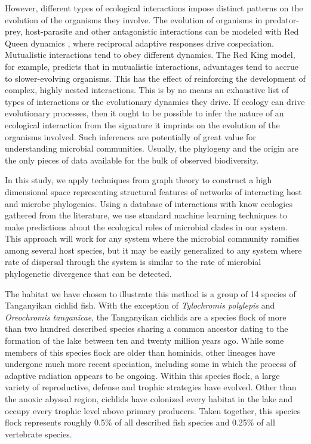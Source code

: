 However, different types of ecological interactions impose distinct patterns on the evolution of the organisms they involve. The evolution of organisms in predator-prey, host-parasite and other antagonistic interactions can be modeled with Red Queen dynamics \cite{van1973new}, where reciprocal adaptive responses drive cospeciation. Mutualistic interactions tend to obey different dynamics. The Red King model, \cite{bergstrom2003red, gokhale2012mutualism} for example, predicts that in mutualistic interactions, advantages tend to accrue to slower-evolving organisms. This has the effect of reinforcing the development of complex, highly nested interactions. \cite{bastolla2009architecture, rezende2007non } This is by no means an exhaustive list of types of interactions or the evolutionary dynamics they drive. If ecology can drive evolutionary processes, then it ought to be possible to infer the nature of an ecological interaction from the signature it imprints on the evolution of the organisms involved. Such inferences are potentially of great value for understanding microbial communities. Usually, the phylogeny and the origin are the only pieces of data available for the bulk of observed biodiversity.

In this study, we apply techniques from graph theory to construct a high dimensional space representing structural features of networks of interacting host and microbe phylogenies. Using a database of interactions with know ecologies gathered from the literature, we use standard machine learning techniques to make predictions about the ecological roles of microbial clades in our system. This approach will work for any system where the microbial community ramifies among several host species, but it may be easily generalized to any system where rate of dispersal through the system is similar to the rate of microbial phylogenetic divergence that can be detected. 

The habitat we have chosen to illustrate this method is a group of 14 species of Tanganyikan cichlid fish. With the exception of {\em Tylochromis polylepis} and {\em Oreochromis tanganicae}, the Tanganyikan cichlids are a species flock of more than two hundred described species sharing a common ancestor dating to the formation of the lake between ten and twenty million years ago. While some members of this species flock are older than hominids, other lineages have undergone much more recent speciation, including some in which the process of adaptive radiation appears to be ongoing. Within this species flock, a large variety of reproductive, defense and trophic strategies have evolved. Other than the anoxic abyssal region, cichlids have colonized every habitat in the lake and occupy every trophic level above primary producers. Taken together, this species flock represents roughly 0.5\% of all described fish species and 0.25\% of all vertebrate species.

